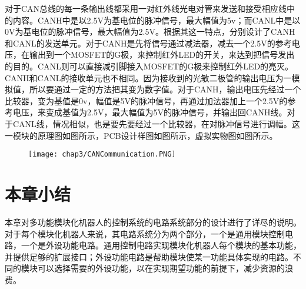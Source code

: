 对于CAN总线的每一条输出线都采用一对红外线光电对管来发送和接受相应线中的内容。CANH中是以2.5V为基电位的脉冲信号，最大幅值为5v；而CANL中是以0V为基电位的脉冲信号，最大幅值为2.5V。根据其这一特点，分别设计了CANH和CANL的发送单元。对于CANH是先将信号通过减法器，减去一个2.5V的参考电压，在输出到一个MOSFET的G极，来控制红外LED的开关，来达到把信号发出的目的。CANL则可以直接减引脚接入MOSFET的G极来控制红外LED的亮灭。CANH和CANL的接收单元也不相同。因为接收到的光敏二极管的输出电压为一模拟值，所以要通过一定的方法把其变为数字值。对于CANH，输出电压先经过一个比较器，变为基值是0v，幅值是5V的脉冲信号，再通过加法器加上一个2.5V的参考电压，来变成基值为2.5V，最大幅值为5V的脉冲信号，并输出回CANH线。对于CANL线，情况相似，也是要先要经过一个比较器，在对脉冲信号进行调幅。这一模块的原理图如图所示，PCB设计样图如图所示，虚拟实物图如图所示。
\begin{figure}[!htp]\label{fig.CANPSch}
  \centering
  \texttt{[image: chap3/CANCommunication.PNG]}
\end{figure}
\begin{figure}\label{fig.CANPPCB}
  \centering
  \hspace{1in}
\end{figure}
\begin{figure}\label{fig.CANPReal}
  \centering
  \hspace{1in}
\end{figure}
\section{本章小结}
本章对多功能模块化机器人的控制系统的电路系统部分的设计进行了详尽的说明。对于每个模块化机器人来说，其电路系统分为两个部分，一个是通用模块控制电路，一个是外设功能电路。通用控制电路实现模块化机器人每个模块的基本功能，并提供足够的扩展接口；外设功能电路是帮助模块使某一功能具体实现的电路。不同的模块可以选择需要的外设功能，以在实现期望功能的前提下，减少资源的浪费。
